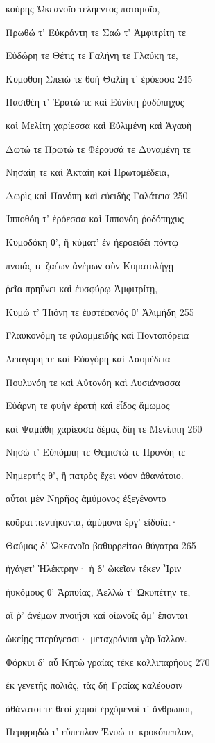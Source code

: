 κούρης Ὠκεανοῖο τελήεντος ποταμοῖο, 

Πρωθώ τ' Εὐκράντη τε Σαώ τ' Ἀμφιτρίτη τε 

Εὐδώρη τε Θέτις τε Γαλήνη τε Γλαύκη τε,

Κυμοθόη Σπειώ τε θοὴ Θαλίη τ' ἐρόεσσα \num{245}

Πασιθέη τ' Ἐρατώ τε καὶ Εὐνίκη ῥοδόπηχυς

καὶ Μελίτη χαρίεσσα καὶ Εὐλιμένη καὶ Ἀγαυὴ

Δωτώ τε Πρωτώ τε Φέρουσά τε Δυναμένη τε

Νησαίη τε καὶ Ἀκταίη καὶ Πρωτομέδεια,

Δωρὶς καὶ Πανόπη καὶ εὐειδὴς Γαλάτεια \num{250} 

Ἱπποθόη τ' ἐρόεσσα καὶ Ἱππονόη ῥοδόπηχυς

Κυμοδόκη θ', ἣ κύματ' ἐν ἠεροειδέι πόντῳ

πνοιάς τε ζαέων ἀνέμων σὺν Κυματολήγῃ

ῥεῖα πρηΰνει καὶ ἐυσφύρῳ Ἀμφιτρίτῃ,

Κυμώ τ' Ἠιόνη τε ἐυστέφανός θ' Ἁλιμήδη \num{255}

Γλαυκονόμη τε φιλομμειδὴς καὶ Ποντοπόρεια

Λειαγόρη τε καὶ Εὐαγόρη καὶ Λαομέδεια 

Πουλυνόη τε καὶ Αὐτονόη καὶ Λυσιάνασσα

Εὐάρνη τε φυὴν ἐρατὴ καὶ εἶδος ἄμωμος

καὶ Ψαμάθη χαρίεσσα δέμας δίη τε Μενίππη \num{260}

Νησώ τ' Εὐπόμπη τε Θεμιστώ τε Προνόη τε

Νημερτής θ', ἣ πατρὸς ἔχει νόον ἀθανάτοιο.

αὗται μὲν Νηρῆος ἀμύμονος ἐξεγένοντο

κοῦραι πεντήκοντα, ἀμύμονα ἔργ' εἰδυῖαι· 

Θαύμας δ' Ὠκεανοῖο βαθυρρείταο θύγατρα \num{265}

ἠγάγετ' Ἠλέκτρην· ἡ δ' ὠκεῖαν τέκεν Ἶριν 

ἠυκόμους θ' Ἁρπυίας, Ἀελλώ τ' Ὠκυπέτην τε, 

αἵ ῥ' ἀνέμων πνοιῇσι καὶ οἰωνοῖς ἅμ' ἕπονται

ὠκείῃς πτερύγεσσι· μεταχρόνιαι γὰρ ἴαλλον. 

Φόρκυι δ' αὖ Κητὼ γραίας τέκε καλλιπαρήους \num{270}

ἐκ γενετῆς πολιάς, τὰς δὴ Γραίας καλέουσιν

ἀθάνατοί τε θεοὶ χαμαὶ ἐρχόμενοί τ' ἄνθρωποι,

Πεμφρηδώ τ' εὔπεπλον Ἐνυώ τε κροκόπεπλον,

